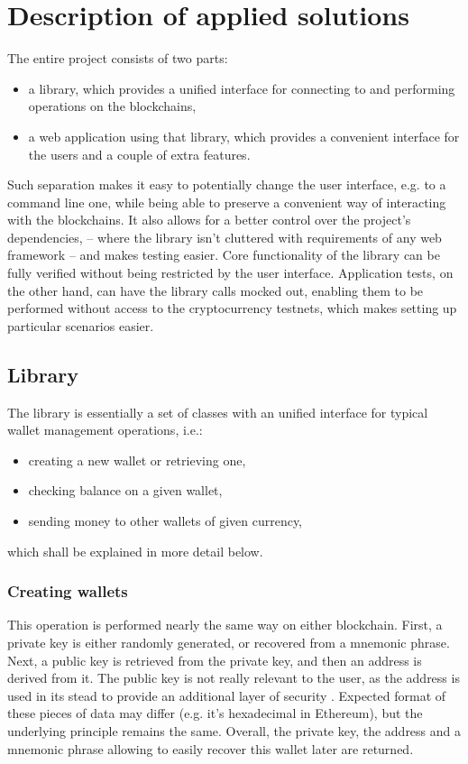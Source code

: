 \chapter{Description of applied solutions}

The entire project consists of two parts:
\begin{itemize}
    \item a library,
    which provides a unified interface for connecting to and performing operations on the blockchains,
    \item a web application using that library,
    which provides a convenient interface for the users and a couple of extra features.
\end{itemize}

Such separation makes it easy to potentially change the user interface, e.g. to a command line one,
while being able to preserve a convenient way of interacting with the blockchains.
It also allows for a better control over the project's dependencies,
-- where the library isn't cluttered with requirements of any web framework
-- and makes testing easier.
Core functionality of the library can be fully verified without being restricted by the user interface. Application tests, on the other hand, can have the library calls mocked out,
enabling them to be performed without access to the cryptocurrency testnets,
which makes setting up particular scenarios easier.

\section{Library}

The library is essentially a set of classes with an unified interface for typical wallet management operations, i.e.:
\begin{itemize}
    \item creating a new wallet or retrieving one,
    \item checking balance on a given wallet,
    \item sending money to other wallets of given currency,
\end{itemize}
which shall be explained in more detail below.

\subsection{Creating wallets}

This operation is performed nearly the same way on either blockchain.
First, a private key is either randomly generated, or recovered from a mnemonic phrase.
Next, a public key is retrieved from the private key, and then an address is derived from it.
The public key is not really relevant to the user,
as the address is used in its stead to provide an additional layer of security \cite{bitcoin-addresses}.
Expected format of these pieces of data may differ (e.g. it's hexadecimal in Ethereum),
but the underlying principle remains the same.
Overall, the private key, the address and a mnemonic phrase
allowing to easily recover this wallet later are returned.

